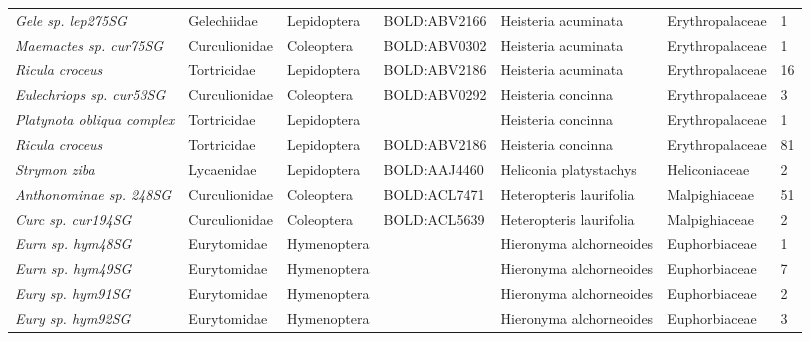 \documentclass[11pt]{article}
\begin{document}
\begin{landscape}
\begin{longtable}{@{}lllllll@{}}
\textit{Gele sp. lep275SG}                            & Gelechiidae     & Lepidoptera  & BOLD:ABV2166 & Heisteria acuminata                & Erythropalaceae  & 1     \\
\textit{Maemactes sp. cur75SG}                        & Curculionidae   & Coleoptera   & BOLD:ABV0302 & Heisteria acuminata                & Erythropalaceae  & 1     \\
\textit{Ricula croceus}                               & Tortricidae     & Lepidoptera  & BOLD:ABV2186 & Heisteria acuminata                & Erythropalaceae  & 16    \\
\textit{Eulechriops sp. cur53SG}                      & Curculionidae   & Coleoptera   & BOLD:ABV0292 & Heisteria concinna                 & Erythropalaceae  & 3     \\
\textit{Platynota obliqua complex}                    & Tortricidae     & Lepidoptera  &              & Heisteria concinna                 & Erythropalaceae  & 1     \\
\textit{Ricula croceus}                               & Tortricidae     & Lepidoptera  & BOLD:ABV2186 & Heisteria concinna                 & Erythropalaceae  & 81    \\
\textit{Strymon ziba}                                 & Lycaenidae      & Lepidoptera  & BOLD:AAJ4460 & Heliconia platystachys             & Heliconiaceae    & 2     \\
\textit{Anthonominae sp. 248SG}                       & Curculionidae   & Coleoptera   & BOLD:ACL7471 & Heteropteris laurifolia            & Malpighiaceae    & 51    \\
\textit{Curc sp. cur194SG}                            & Curculionidae   & Coleoptera   & BOLD:ACL5639 & Heteropteris laurifolia            & Malpighiaceae    & 2     \\
\textit{Eurn sp. hym48SG}                             & Eurytomidae     & Hymenoptera  &              & Hieronyma alchorneoides            & Euphorbiaceae    & 1     \\
\textit{Eurn sp. hym49SG}                             & Eurytomidae     & Hymenoptera  &              & Hieronyma alchorneoides            & Euphorbiaceae    & 7     \\
\textit{Eury sp. hym91SG}                             & Eurytomidae     & Hymenoptera  &              & Hieronyma alchorneoides            & Euphorbiaceae    & 2     \\
\textit{Eury sp. hym92SG}                             & Eurytomidae     & Hymenoptera  &              & Hieronyma alchorneoides            & Euphorbiaceae    & 3     \\

\end{longtable}
\end{landscape}
\end{document}
